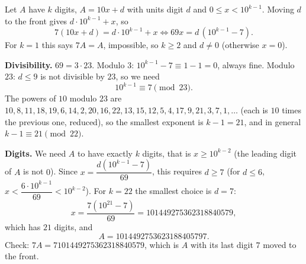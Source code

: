 Let $A$ have $k$ digits, $A=10x+d$ with units digit $d$ and $0\le x<10^{k-1}$. Moving $d$ to the front gives $d\cdot10^{k-1}+x$, so
\[
7(10x+d)=d\cdot10^{k-1}+x\iff 69x=d\,(10^{k-1}-7).
\]
For $k=1$ this says $7A=A$, impossible, so $k\ge2$ and $d\ne0$ (otherwise $x=0$).

\textbf{Divisibility.} $69=3\cdot23$. Modulo $3$: $10^{k-1}-7\equiv1-1=0$, always fine. Modulo $23$: $d\le9$ is not divisible by $23$, so we need
\[
10^{k-1}\equiv7\pmod{23}.
\]
The powers of $10$ modulo $23$ are $10,8,11,18,19,6,14,2,20,16,22,13,15,12,5,4,17,9,21,3,7,1,\dots$ (each is $10$ times the previous one, reduced), so the smallest exponent is $k-1=21$, and in general $k-1\equiv21\pmod{22}$.

\textbf{Digits.} We need $A$ to have exactly $k$ digits, that is $x\ge10^{k-2}$ (the leading digit of $A$ is not $0$). Since $x=\dfrac{d(10^{k-1}-7)}{69}$, this requires $d\ge7$ (for $d\le6$, $x<\dfrac{6\cdot10^{k-1}}{69}<10^{k-2}$). For $k=22$ the smallest choice is $d=7$:
\[
x=\dfrac{7(10^{21}-7)}{69}=101449275362318840579,
\]
which has $21$ digits, and
\[
A=\boxed{1014492753623188405797}.
\]
Check: $7A=7101449275362318840579$, which is $A$ with its last digit $7$ moved to the front.
